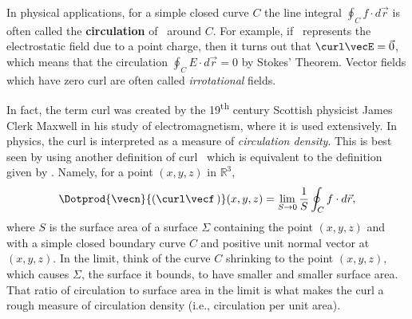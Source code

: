 
In physical applications, for a simple closed curve $C$ the line integral $\oint_{C}{f}\cdot d\vec{r}$ is often called the \textbf{circulation} of \vecf\ around $C$. For example, if \vecE\ represents the electrostatic field due to a point charge, then it turns out
that $\curl\vecE = \vec0$, which means that the circulation $\oint_{C}{E}\cdot d\vec{r}=0$ by Stokes' Theorem. Vector fields which have zero curl are often called \emph{irrotational} fields.

In fact, the term curl was created by the 19\textsuperscript{th} century Scottish physicist James Clerk Maxwell in his study of electromagnetism, where it is used extensively. In physics, the curl is interpreted as a measure of \emph{circulation density}. This is best seen by using another definition of curl \vecf\ which is equivalent
to the definition given by . Namely, for a point $(x,y,z)$ in $\mathbb{R}^{3}$,
\[
 \Dotprod{\vecn}{(\curl\vecf\,)}(x,y,z) = \lim_{S \to 0} \frac{1}{S} \oint_{C}{f}\cdot d\vec{r} ,
\]
where $S$ is the surface area of a surface $\Sigma$ containing the point $(x,y,z)$ and with a simple closed boundary curve $C$ and positive unit normal vector \vecn at $(x,y,z)$. In the limit, think of the curve $C$ shrinking to the point $(x,y,z)$, which causes $\Sigma$, the surface it bounds, to have smaller and smaller surface area. That ratio of circulation to surface area in the limit is what makes the curl a rough measure of circulation density (i.e., circulation per unit area).

